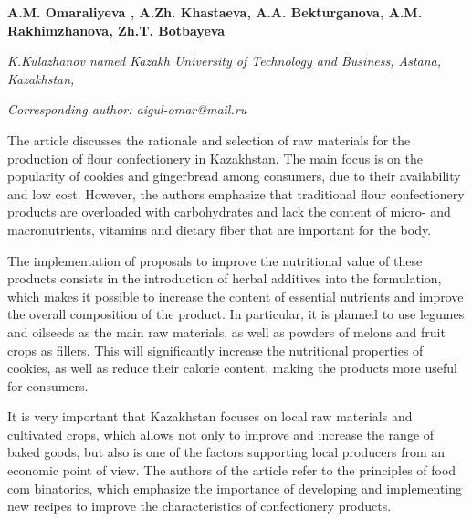 
\begin{articleheader}

{\bfseries
A.M. Omaraliyeva\textsuperscript{\envelope } \authorid,
A.Zh. Khastaeva\authorid,
A.A. Bekturganova\authorid,
A.M. Rakhimzhanova\authorid,
Zh.T. Botbayeva\authorid}
\end{articleheader}

\begin{affiliation}
\emph{K.Kulazhanov named Kazakh University of Technology and Business, Astana, Kazakhstan,}

\raggedright \textsuperscript{\envelope }{\em Corresponding author: aigul-omar@mail.ru}
\end{affiliation}

The article discusses the rationale and selection of raw materials for
the production of flour confectionery in Kazakhstan. The main focus is
on the popularity of cookies and gingerbread among consumers, due to
their availability and low cost. However, the authors emphasize that
traditional flour confectionery products are overloaded with
carbohydrates and lack the content of micro- and macronutrients,
vitamins and dietary fiber that are important for the body.

The implementation of proposals to improve the nutritional value of
these products consists in the introduction of herbal additives into the
formulation, which makes it possible to increase the content of
essential nutrients and improve the overall composition of the product.
In particular, it is planned to use legumes and oilseeds as the main raw
materials, as well as powders of melons and fruit crops as fillers. This
will significantly increase the nutritional properties of cookies, as
well as reduce their calorie content, making the products more useful
for consumers.

It is very important that Kazakhstan focuses on local raw materials and
cultivated crops, which allows not only to improve and increase the
range of baked goods, but also is one of the factors supporting local
producers from an economic point of view. The authors of the article
refer to the principles of food com binatorics, which emphasize the
importance of developing and implementing new recipes to improve the
characteristics of confectionery products.

